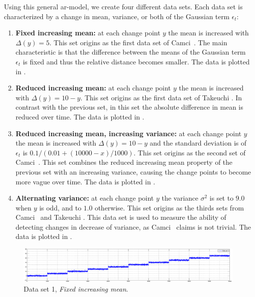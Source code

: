 Using this general \gls{ar}-model, we create four different data sets.
Each data set is characterized by a change in mean, variance, or both of the Gaussian term $\epsilon_t$:
\begin{enumerate}
  \item \textbf{Fixed increasing mean:} at each change point $y$ the mean is increased with $\Delta(y) = 5$.
  This set origins as the first data set of Camci~\cite{camci2010change}.
  The main characteristic is that the difference between the means of the Gaussian term $\epsilon_t$ is fixed and thus the relative distance becomes smaller.
  The data is plotted in .

  \item \textbf{Reduced increasing mean:} at each change point $y$ the mean is increased with $\Delta(y) = 10 - y$.
  This set origins as the first data set of Takeuchi \etal \cite{takeuchi2006unifying}.
  In contrast with the previous set, in this set the absolute difference in mean is reduced over time.
  The data is plotted in .

  \item \textbf{Reduced increasing mean, increasing variance:} at each change point $y$ the mean is increased with $\Delta(y) = 10 - y$ and the standard deviation is of $\epsilon_t$ is $0.1 / (0.01 + (10000 - x)/1000)$.
  This set origins as the second set of Camci~\cite{camci2010change}.
  This set combines the reduced increasing mean property of the previous set with an increasing variance, causing the change points to become more vague over time.
  The data is plotted in .

  \item \textbf{Alternating variance:} at each change point $y$ the variance $\sigma^2$ is set to $9.0$ when $y$ is odd, and to $1.0$ otherwise.
  This set origins as the thirds sets from Camci~\cite{camci2010change} and Takeuchi \etal \cite{takeuchi2006unifying}.
  This data set is used to measure the ability of detecting changes in decrease of variance, as Camci~\cite{camci2010change} claims is not trivial.
  The data is plotted in .
\end{enumerate}

\begin{figure}
\centering
  \includegraphics[width=1\textwidth]{./Figures/chapter5/set_1_data.eps}
  \caption[Fixed increasing mean]{Data set 1, \emph{Fixed increasing mean}.}
  \label{fig:camci_fixed_increasing_mean}
\end{figure}

